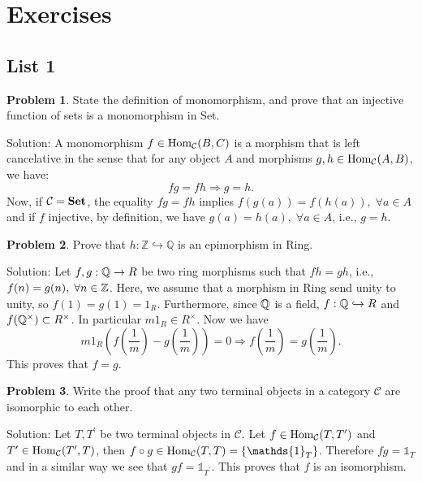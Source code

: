 \chapter{Exercises}
\section{List 1}
\begin{dang}
    \textbf{Problem 1}. State the definition of monomorphism, 
    and prove that an injective function of sets is a monomorphism in Set.
\end{dang}
Solution: A monomorphism $f\in\text{Hom}_{\mathcal{C}}(B,C)$ is a morphism that is left cancelative in the sense that 
for any object $A$ and morphisms $g,h\in\text{Hom}_{\mathcal{C}}(A,B)$, we have:
\begin{equation}
    fg = fh \Rightarrow g= h.
\end{equation}
Now, if $\mathcal{C} = \textbf{Set}$, the equality $fg=fh$ implies $f(g(a))=f(h(a)),\;\forall a\in A$ and if $f$ injective, by 
definition, we have $g(a)=h(a),\;\forall a\in A$, i.e., $g=h$.

\begin{dang}
    \textbf{Problem 2}. Prove that $h:\mathbb{Z}\hookrightarrow \mathbb{Q}$ is an epimorphism in Ring.
\end{dang}
Solution: Let $f,g:\mathbb{Q}\to R$ be two ring morphisms such that $fh=gh$, i.e., $f(n)=g(n),\;\forall n\in\mathbb{Z}$. Here, we 
assume that a morphism in Ring send unity to unity, so $f(1)=g(1)=1_R$. Furthermore, since $\mathbb{Q}$ is a field, 
$f:\mathbb{Q}\hookrightarrow R$ and $f(\mathbb{Q}^\times)\subset R^\times$. In particular $m1_R\in R^\times$. Now we have
\begin{equation}
    m1_R(f(\frac{1}{m})-g(\frac{1}{m})) = 0\Rightarrow f(\frac{1}{m})=g(\frac{1}{m}).
\end{equation}
This proves that $f=g$.


\begin{dang}
    \textbf{Problem 3}. Write the proof that any two terminal objects in a category 
    $\mathcal{C}$ are isomorphic to each other.
\end{dang}
Solution: Let $T,T^\prime$ be two terminal objects in $\mathcal{C}$. Let $f\in\text{Hom}_{\mathcal{C}}(T,T^\prime)$ 
and $T^\prime\in\text{Hom}_{\mathcal{C}}(T^\prime,T)$, then $f\circ g\in\Hom_{\callC}(T,T)=\{\mathds{1}_{T}\}$. Therefore 
$fg = \mathds{1}_{T}$ and in a similar way we see that $gf = \mathds{1}_{T^\prime}$. This proves that 
$f$ is an isomorphism.

